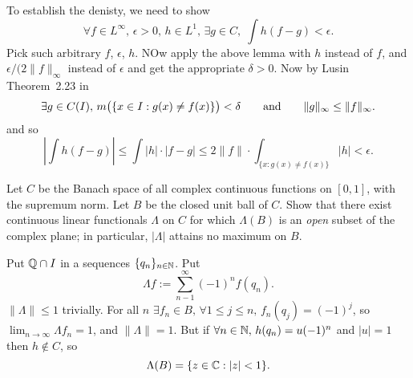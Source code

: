 \begin{enumerate}
To establish the denisty, we need to show
\begin{equation*}
\forall f\in L^\infty,\,\epsilon>0,\,h\in L^1,\,\exists g\in C,
\; \int h(f-g)<\epsilon.
\end{equation*}
Pick such arbitrary $f$, \(\epsilon\), $h$.
NOw apply the above lemma with $h$ instead of $f$,
and \(\epsilon/(2\|f\|_\infty\) instead of \(\epsilon\) and get the appropriate
\(\delta>0\). Now by
Lusin Theorem~2.23 in \cite{RudinRCA87}
\begin{equation*}
\exists g\in C(I),\, m\bigl(\{x\in I: g(x)\neq f(x)\}\bigr) < \delta
\qquad \textnormal{and} \qquad \|g\|_\infty \leq \|f\|_\infty.
\end{equation*}
and so
\begin{equation*}
\left|\int h(f-g)\right|
\leq \int |h|\cdot|f-g| \leq 2\|f\|\cdot \int_{\{x: g(x)\neq f(x)\}} |h| < \epsilon.
\end{equation*}

\begin{excopy}
Let $C$ be the Banach space of all complex continuous functions on \([0,1]\),
with the supremum norm.
Let $B$ be the closed unit ball of $C$.
Show that there exist continuous linear functionals \(\Lambda\) on $C$
for which \(\Lambda(B)\) is an \emph{open} subset of the
complex plane; in particular, \(|\Lambda|\) attains no maximum on $B$.
\end{excopy}

Put \(\mathbb{Q}\cap I\) in a sequences \(\{q_n\}_{n\in\mathbb{N}}\). Put
\begin{equation*}
\Lambda f := \sum_{n-1}^\infty (-1)^n f(q_n).
\end{equation*}
\(\|\Lambda\| \leq 1\) trivially.
For all $n$ \(\exists f_n \in B,\,\forall 1\leq j\leq n,\, f_n(q_j) = (-1)^j\),
so \(\lim_{n\to\infty} \Lambda f_n = 1\), and \(\|\Lambda\|=1\).
But if \(\forall n\in\mathbb{N},\, h(q_n) = u(-1)^n\) and \(|u|=1\)
then \(h\notin C\), so
\begin{equation*}
\Lambda(B) = \{z\in\mathbb{C}: |z|<1\}.
\end{equation*}


\end{enumerate}
